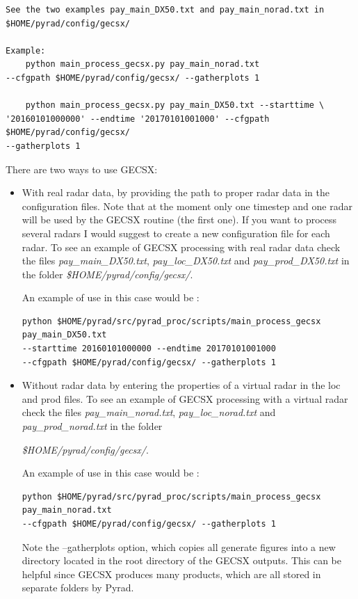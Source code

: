 \documentclass[a4paper,11pt,pdftex,twoside]{scrartcl}
\begin{document}
{{{\begin{verbatim}
See the two examples pay_main_DX50.txt and pay_main_norad.txt in
$HOME/pyrad/config/gecsx/

Example:
    python main_process_gecsx.py pay_main_norad.txt
--cfgpath $HOME/pyrad/config/gecsx/ --gatherplots 1

    python main_process_gecsx.py pay_main_DX50.txt --starttime \
'20160101000000' --endtime '20170101001000' --cfgpath $HOME/pyrad/config/gecsx/
--gatherplots 1

\end{verbatim}

There are two ways to use GECSX:

\begin{itemize}
 \item With real radar data, by providing the path to proper radar data in the configuration files. Note that at the moment only one timestep and one radar will be used by the GECSX routine (the first one). If you want to process several radars I would suggest to create a new configuration file for each radar. To see an example of GECSX processing with real radar data check the files \textit{pay\_main\_DX50.txt}, \textit{pay\_loc\_DX50.txt} and \textit{pay\_prod\_DX50.txt} in the folder \textit{\$HOME/pyrad/config/gecsx/}.

 An example of use in this case would be :
 \begin{verbatim}
python $HOME/pyrad/src/pyrad_proc/scripts/main_process_gecsx pay_main_DX50.txt
--starttime 20160101000000 --endtime 20170101001000
--cfgpath $HOME/pyrad/config/gecsx/ --gatherplots 1
\end{verbatim}
 \item Without radar data by entering the properties of a virtual radar in the loc and prod files. To see an example of GECSX processing with a virtual radar check the files \textit{pay\_main\_norad.txt}, \textit{pay\_loc\_norad.txt} and \textit{pay\_prod\_norad.txt} in the folder

 \textit{\$HOME/pyrad/config/gecsx/}.

 An example of use in this case would be :
 \begin{verbatim}
python $HOME/pyrad/src/pyrad_proc/scripts/main_process_gecsx pay_main_norad.txt
--cfgpath $HOME/pyrad/config/gecsx/ --gatherplots 1
\end{verbatim}
Note the --gatherplots option, which copies all generate figures into a new directory located in the root directory of the GECSX outputs. This can be helpful since GECSX produces many products, which are all stored in separate folders by Pyrad.
\end{itemize}

}}}
\end{document}
